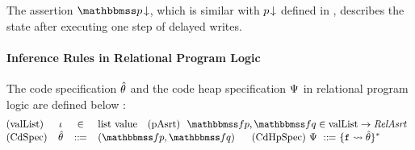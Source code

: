 The assertion $\nxtAst{\relastP}$, which is similar with 
${p}\!\downarrow$ defined in \Fig{\ref{fig:Semantics of Assertions}}, 
describes the
state after executing one step of delayed writes.

\paragraph{Inference Rules in Relational Program Logic}
The code specification $\hat{\theta}$ and 
the code heap specification $\Psi$ 
in relational program logic are defined below :
\[
    \small
    \!\!\!\!
    \begin{array}{lccl}
        \TYPE{(valList)} &
        \lgvl & \in & \TYPE{list} \ \TYPE{value}
        \ \ \
        \TYPE{(pAsrt)} \ \
        \relspecpre, \relspecpost \in
        \TYPE{valList} \rightarrow \textit{RelAsrt} \\
        \TYPE{(CdSpec)} & \RelBspec & \define &
        (\relspecpre, \relspecpost) \quad \ \
        \TYPE{(CdHpSpec)} \ \Cspec \ \define \
        \{ \lab{} \rightsquigarrow \RelBspec \}^{*}
    \end{array}
\]
			
